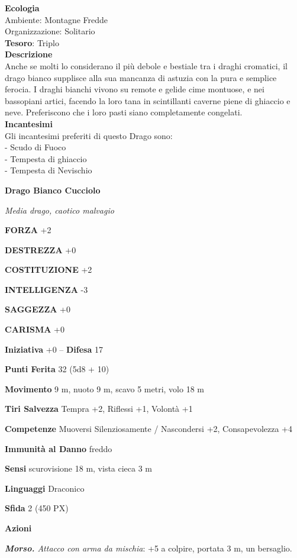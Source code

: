\begin{multicols}{2}
\textbf{Ecologia}\\
Ambiente: Montagne Fredde\\
Organizzazione: Solitario\\
\textbf{Tesoro}: Triplo\\
\textbf{Descrizione}\\
Anche se molti lo considerano il più debole e bestiale tra i draghi cromatici, il drago bianco supplisce alla sua mancanza di astuzia con la pura e semplice ferocia. I draghi bianchi vivono su remote e gelide cime montuose, e nei bassopiani artici, facendo la loro tana in scintillanti caverne piene di ghiaccio e neve. Preferiscono che i loro pasti siano completamente congelati.\\
\textbf{Incantesimi}\\
Gli incantesimi preferiti di questo Drago sono:\\
- Scudo di Fuoco\\
- Tempesta di ghiaccio\\
- Tempesta di Nevischio


\medskip{}\textbf{Drago Bianco Cucciolo}

\textit{Media drago, caotico malvagio}

\textbf{FORZA} +2

\textbf{DESTREZZA} +0

\textbf{COSTITUZIONE} +2

\textbf{INTELLIGENZA} -3

\textbf{SAGGEZZA} +0

\textbf{CARISMA} +0

\textbf{Iniziativa} +0 -- \textbf{Difesa} 17

\textbf{Punti Ferita} 32 (5d8 + 10)

\textbf{Movimento} 9 m, nuoto 9 m, scavo 5 metri, volo 18 m

\textbf{Tiri Salvezza} Tempra +2, Riflessi +1, Volontà +1

\textbf{Competenze} Muoversi Silenziosamente / Nascondersi +2, Consapevolezza +4

\textbf{Immunità al Danno} freddo

\textbf{Sensi} scurovisione 18 m, vista cieca 3 m

\textbf{Linguaggi} Draconico

\textbf{Sfida} 2 (450 PX)

\textbf{Azioni}

\textit{\textbf{Morso.} Attacco con arma da mischia}: +5 a colpire, portata 3 m, un bersaglio.


\end{multicols}
